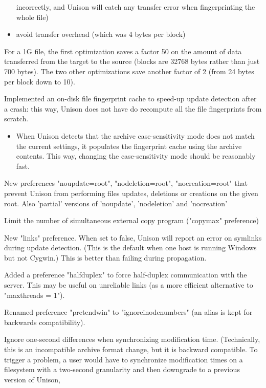 \begin{changesfromversion}{2.32}
\begin{itemize}
    incorrectly, and Unison will catch any transfer error when
    fingerprinting the whole file)
  \item avoid transfer overhead (which was 4 bytes per block)
\end{itemize}
  For a 1G file, the first optimization saves a factor 50 on the
  amount of data transferred from the target to the source (blocks
  are 32768 bytes rather than just 700 bytes).  The two other
  optimizations save another factor of 2 (from 24 bytes per block
  down to 10).
\item Implemented an on-disk file fingerprint cache to speed-up update
  detection after a crash: this way, Unison does not have do recompute
  all the file fingerprints from scratch.
  \begin{itemize}
  \item When Unison detects that the archive case-sensitivity mode
  does not match the current settings, it populates the fingerprint
  cache using the archive contents.  This way, changing the
  case-sensitivity mode should be reasonably fast.
  \end{itemize}
\item New preferences "noupdate=root", "nodeletion=root", "nocreation=root"
  that prevent Unison from performing files updates, deletions or
  creations on the given root.  Also 'partial' versions of 'noupdate',
  'nodeletion' and 'nocreation'
\item Limit the number of simultaneous external copy program
  ("copymax" preference)
\item New "links" preference.  When set to false, Unison will report an
  error on symlinks during update detection.  (This is the default
  when one host is running Windows but not Cygwin.)  This is better
  than failing during propagation.
\item Added a preference "halfduplex" to force half-duplex communication
  with the server.  This may be useful on unreliable links (as a more
  efficient alternative to "maxthreads = 1").
\item Renamed preference "pretendwin" to "ignoreinodenumbers" (an alias is
  kept for backwards compatibility).
\item Ignore one-second differences when synchronizing modification time.
  (Technically, this is an incompatible archive format change, but it
   is backward compatible.  To trigger a problem, a user would have to
   synchronize modification times on a filesystem with a two-second
   granularity and then downgrade to a previous version of Unison,

\end{changesfromversion}

